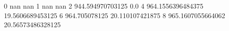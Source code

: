 0 nan nan
1 nan nan
2 944.594970703125 0.0
4 964.1556396484375 19.5606689453125
6 964.705078125 20.110107421875
8 965.1607055664062 20.56573486328125
